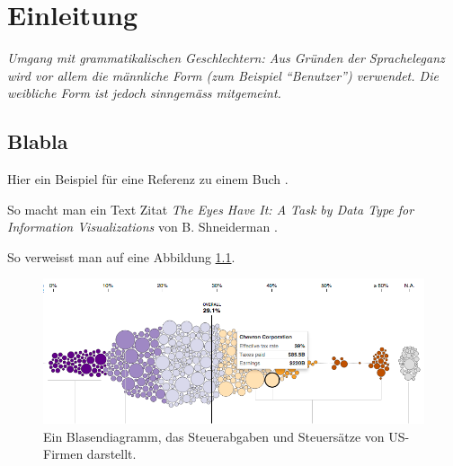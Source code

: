 \chapter{Einleitung}

\textit{Umgang mit grammatikalischen Geschlechtern: Aus Gründen der Spracheleganz wird vor allem die männliche Form (zum Beispiel "`Benutzer"') verwendet. Die weibliche Form ist jedoch sinngemäss mitgemeint.}

\section{Blabla}



Hier ein Beispiel für eine Referenz zu einem Buch \cite{viz}. 



So macht man ein Text Zitat \textit{The Eyes Have It: A Task by Data Type for Information Visualizations} von B. Shneiderman \cite{shneiderman}. 


So verweisst man auf eine Abbildung \ref{fig:nytimes-taxes}.

\begin{figure}[H]
	\centering
	\includegraphics[width=\linewidth]{images/nytimes-taxes-zugeschnitten}
	\caption[Blasendiagramm in The New York Times ()]{Ein Blasendiagramm, das Steuerabgaben und Steuersätze von US-Firmen darstellt. \cite{nytimes-taxes}}
	\label{fig:nytimes-taxes}%
\end{figure}
